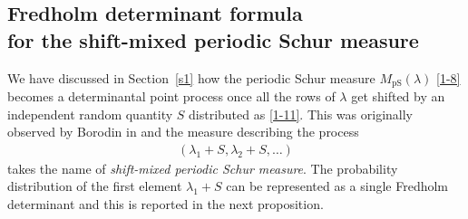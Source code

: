\documentclass[11pt]{article}
\numberwithin{equation}{section}
\numberwithin{equation}{section}
\def\l{\lambda}
\begin{document}
\subsection[Fredholm determinant formula for the shift-mixed periodic Schur measure]{Fredholm determinant formula \\
for the shift-mixed periodic Schur measure}\label{s22}

We have discussed in Section~\ref{s1} how the periodic Schur measure $M_{\text{pS}}(\l)$ \eqref{1-8} becomes a determinantal point process once all the rows of $\lambda$ get shifted by an independent random quantity $S$ distributed as \eqref{1-11}. This was originally observed by Borodin in \cite{Borodin2007PeriodicSchur} and the measure describing the process
\begin{align}
\label{216}
(\l_1+S,\l_2+S,\dots)
\end{align}
takes the name of \emph{shift-mixed periodic Schur measure}. The probability distribution of the first element $\l_1+S$ can be represented as a single Fredholm determinant and this is reported in the next proposition.

\end{document}
